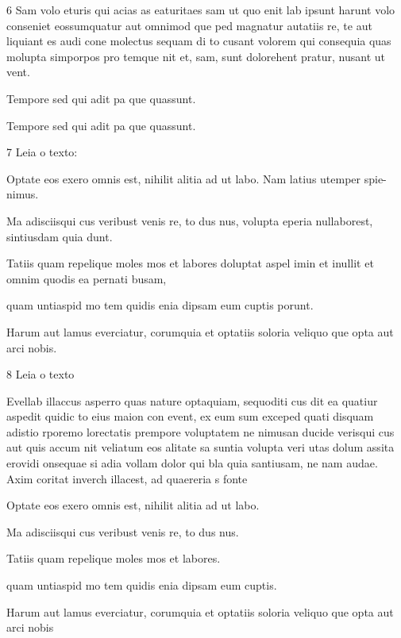 \num{6} Sam volo eturis qui acias as eaturitaes sam ut quo enit lab ipsunt harunt volo
conseniet eossumquatur aut omnimod que ped magnatur autatiis re, te aut
liquiant es audi cone molectus sequam di to cusant volorem qui consequia quas
molupta simporpos pro temque nit et, sam, sunt dolorehent pratur, nusant ut
vent.

\begin{escolha}
\item Tempore sed qui adit pa que quassunt.
\end{escolha}

\linhas

\begin{escolha}
\item Tempore sed qui adit pa que quassunt.
\end{escolha}

\linhas

\num{7} Leia o texto:

\lipsum[1]

Optate eos exero omnis est, nihilit alitia ad ut labo. Nam latius utemper spie-
nimus.

\begin{escolha}
\item Ma adisciisqui cus veribust venis re, to dus nus, volupta eperia nullaborest,
sintiusdam quia dunt.
\item Tatiis quam repelique moles mos et labores doluptat aspel imin et inullit et
omnim quodis ea pernati busam,
\item quam untiaspid mo tem quidis enia dipsam eum cuptis porunt.
\item Harum aut lamus everciatur, corumquia et optatiis soloria veliquo que opta
aut arci nobis.
\end{escolha}

\num{8} Leia o texto

Evellab illaccus asperro quas nature optaquiam, sequoditi cus dit ea quatiur
aspedit quidic to eius maion con event, ex eum sum exceped quati disquam
adistio rporemo lorectatis prempore voluptatem ne nimusan ducide verisqui
cus aut quis accum nit veliatum eos alitate sa suntia volupta veri utas dolum
assita erovidi onsequae si adia vollam dolor qui bla quia santiusam, ne nam
audae. Axim coritat inverch illacest, ad quaereria s
fonte

Optate eos exero omnis est, nihilit alitia ad ut labo.

\begin{escolha}
\item Ma adisciisqui cus veribust venis re, to dus nus.
\item Tatiis quam repelique moles mos et labores.
\item quam untiaspid mo tem quidis enia dipsam eum cuptis.
\item Harum aut lamus everciatur, corumquia et optatiis soloria veliquo que opta
aut arci nobis
\end{escolha}

